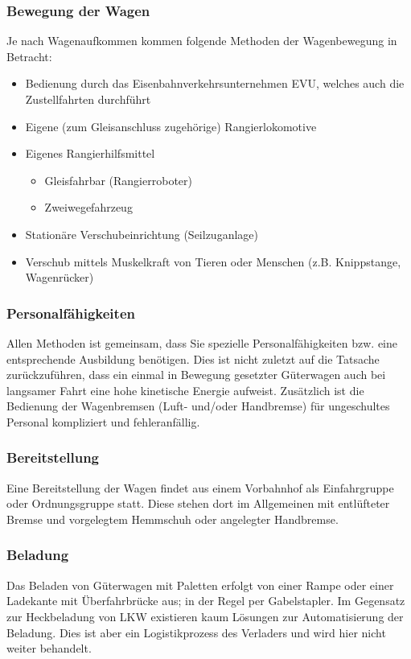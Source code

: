 \subsubsection{Bewegung der Wagen} \label{sec:BewdWagen}
Je nach Wagenaufkommen kommen folgende Methoden der Wagenbewegung in Betracht:
\begin{itemize}
	\item Bedienung durch das \gls{Eisenbahnverkehrsunternehmen} \acrshort{EVU}, welches auch die Zustellfahrten durchführt
	\item Eigene (zum \gls{Gleisanschluss} zugehörige) Rangierlokomotive
	\item Eigenes Rangierhilfsmittel
	\begin{itemize}
	    \item Gleisfahrbar (Rangierroboter)
	    \item \gls{Zweiwegefahrzeug}
	\end{itemize}
	\item Stationäre Verschubeinrichtung (Seilzuganlage)
	\item Verschub mittels Muskelkraft von Tieren oder Menschen (z.B. Knippstange, Wagenrücker)
\end{itemize}
\subsubsection{Personalfähigkeiten}\label{sec:Personal}
Allen Methoden ist gemeinsam, dass Sie spezielle Personalfähigkeiten bzw. eine entsprechende Ausbildung benötigen. Dies ist nicht zuletzt auf die Tatsache zurückzuführen, dass ein einmal in Bewegung gesetzter Güterwagen auch bei langsamer Fahrt eine hohe kinetische Energie aufweist. Zusätzlich ist die Bedienung der Wagenbremsen (Luft- und/oder Handbremse) für ungeschultes Personal kompliziert und fehleranfällig.
\subsubsection{Bereitstellung}
Eine Bereitstellung der Wagen findet aus einem \gls{Vorbahnhof} als Einfahrgruppe oder Ordnungsgruppe statt. Diese stehen dort im Allgemeinen mit entlüfteter Bremse und vorgelegtem Hemmschuh oder angelegter Handbremse.
\subsubsection{Beladung}
Das Beladen von Güterwagen mit Paletten erfolgt von einer Rampe oder einer Ladekante mit Überfahrbrücke aus; in der Regel per Gabelstapler. Im Gegensatz zur Heckbeladung von LKW existieren kaum Lösungen zur Automatisierung der Beladung. Dies ist aber ein Logistikprozess des Verladers und wird hier nicht weiter behandelt.
